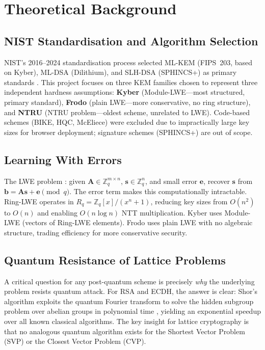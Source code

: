 \documentclass[11pt,a4paper]{article}
\begin{document}
\section{Theoretical Background}

\subsection{NIST Standardisation and Algorithm Selection}

NIST's 2016--2024 standardisation process selected ML-KEM (FIPS~203, based on Kyber), ML-DSA (Dilithium), and SLH-DSA (SPHINCS+) as primary standards \cite{nist2024}. This project focuses on three KEM families chosen to represent three independent hardness assumptions: \textbf{Kyber} (Module-LWE---most structured, primary standard), \textbf{Frodo} (plain LWE---more conservative, no ring structure), and \textbf{NTRU} (NTRU problem---oldest scheme, unrelated to LWE). Code-based schemes (BIKE, HQC, McEliece) were excluded due to impractically large key sizes for browser deployment; signature schemes (SPHINCS+) are out of scope.

\subsection{Learning With Errors}

The LWE problem \cite{regev2005}: given $\mathbf{A}\in\mathbb{Z}_q^{m\times n}$, $\mathbf{s}\in\mathbb{Z}_q^n$, and small error $\mathbf{e}$, recover $\mathbf{s}$ from $\mathbf{b}=\mathbf{A}\mathbf{s}+\mathbf{e}\pmod{q}$. The error term makes this computationally intractable. Ring-LWE \cite{lyubashevsky2010} operates in $R_q=\mathbb{Z}_q[x]/(x^n+1)$, reducing key sizes from $O(n^2)$ to $O(n)$ and enabling $O(n\log n)$ NTT multiplication. Kyber uses Module-LWE (vectors of Ring-LWE elements). Frodo uses plain LWE with no algebraic structure, trading efficiency for more conservative security.

\subsection{Quantum Resistance of Lattice Problems}

A critical question for any post-quantum scheme is precisely \emph{why} the underlying problem resists quantum attack. For RSA and ECDH, the answer is clear: Shor's algorithm exploits the quantum Fourier transform to solve the hidden subgroup problem over abelian groups in polynomial time \cite{shor1994}, yielding an exponential speedup over all known classical algorithms. The key insight for lattice cryptography is that no analogous quantum algorithm exists for the Shortest Vector Problem (SVP) or the Closest Vector Problem (CVP).
\end{document}
